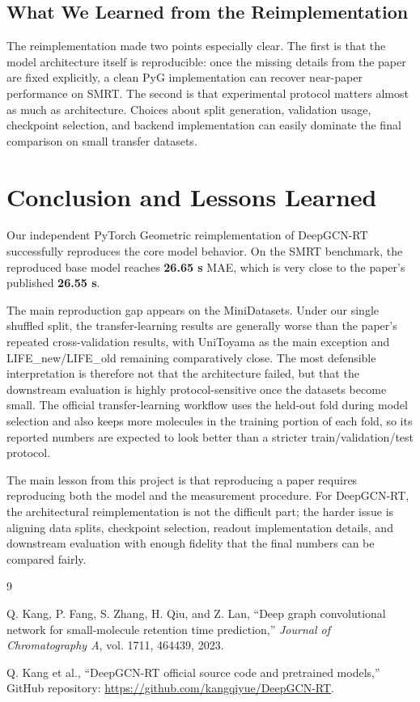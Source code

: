 \subsection{What We Learned from the Reimplementation}

The reimplementation made two points especially clear. The first is that the model architecture itself is reproducible: once the missing details from the paper are fixed explicitly, a clean PyG implementation can recover near-paper performance on SMRT. The second is that experimental protocol matters almost as much as architecture. Choices about split generation, validation usage, checkpoint selection, and backend implementation can easily dominate the final comparison on small transfer datasets.

\section{Conclusion and Lessons Learned}

Our independent PyTorch Geometric reimplementation of DeepGCN-RT successfully reproduces the core model behavior. On the SMRT benchmark, the reproduced base model reaches \textbf{26.65 s} MAE, which is very close to the paper's published \textbf{26.55 s}.

The main reproduction gap appears on the MiniDatasets. Under our single shuffled split, the transfer-learning results are generally worse than the paper's repeated cross-validation results, with UniToyama as the main exception and LIFE\_new/LIFE\_old remaining comparatively close. The most defensible interpretation is therefore not that the architecture failed, but that the downstream evaluation is highly protocol-sensitive once the datasets become small. The official transfer-learning workflow uses the held-out fold during model selection and also keeps more molecules in the training portion of each fold, so its reported numbers are expected to look better than a stricter train/validation/test protocol.

The main lesson from this project is that reproducing a paper requires reproducing both the model and the measurement procedure. For DeepGCN-RT, the architectural reimplementation is not the difficult part; the harder issue is aligning data splits, checkpoint selection, readout implementation details, and downstream evaluation with enough fidelity that the final numbers can be compared fairly.

\begin{thebibliography}{9}

    Q. Kang, P. Fang, S. Zhang, H. Qiu, and Z. Lan,
    \newblock ``Deep graph convolutional network for small-molecule retention time prediction,''
    \newblock \emph{Journal of Chromatography A}, vol. 1711, 464439, 2023.

    Q. Kang et al.,
    \newblock ``DeepGCN-RT official source code and pretrained models,''
    \newblock GitHub repository: \url{https://github.com/kangqiyue/DeepGCN-RT}.

\end{thebibliography}
